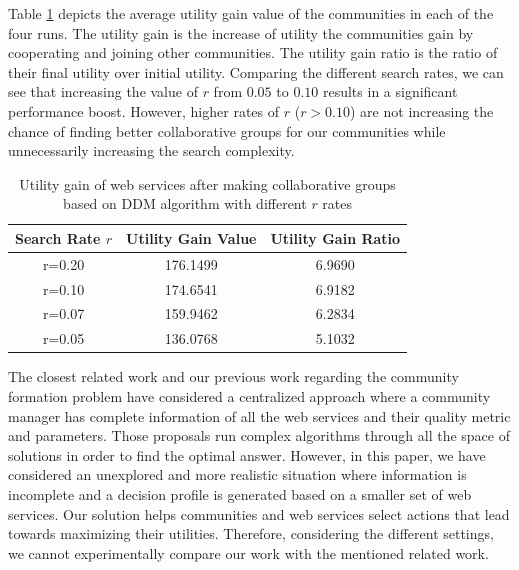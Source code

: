 \documentclass[11pt,onecolumn]{IEEEtran}
\begin{document}
Table \ref{table:valueandgain} depicts the average utility gain value of the communities in each of the four runs. The utility gain is the increase of utility the communities gain by cooperating and joining other communities. The utility gain ratio is the ratio of their final utility over initial utility. Comparing the different search rates, we can see that increasing the value of $r$ from $0.05$ to $0.10$ results in a significant performance boost. However, higher rates of $r$ ($r > 0.10$) are not increasing the chance of finding better collaborative groups for our communities while unnecessarily increasing the search complexity. 

\begin{table}[ht]
\caption{Utility gain of web services after making collaborative groups based on DDM algorithm with different $r$ rates} %
\centering %
{\renewcommand{\arraystretch}{1.2}
\begin{tabular}{c|c|c} %
\hline\hline %
Search Rate $r$ & Utility Gain Value & Utility Gain Ratio \\ [0.5ex] %
\hline %
r=0.20 & 176.1499 & 6.9690 \\
r=0.10 & 174.6541 & 6.9182 \\
r=0.07 & 159.9462 & 6.2834 \\
r=0.05 & 136.0768 & 5.1032 \\ [1ex] %
\hline %
\end{tabular}
}
\label{table:valueandgain} %
\end{table}


%


The closest related work \cite{10.1109/TSC.2012.12,
DBLP:conf/IEEEscc/LimTMB12, DBLP:conf/IEEEscc/KhosravifarABT11} and our
previous work \cite{journal-community-formation} regarding the community formation problem have considered a centralized approach where a community manager has complete information of all the web services and their quality
metric and parameters. Those proposals run complex algorithms through all the space of
solutions in order to find the optimal answer. However, in this paper, we
have considered an unexplored and more realistic situation where information is incomplete and a decision
profile is generated based on a smaller set of web services. Our solution helps
communities and web services select actions that lead towards
maximizing their utilities. Therefore, considering the different settings,
we cannot experimentally compare our work with the mentioned related work.
\end{document}
